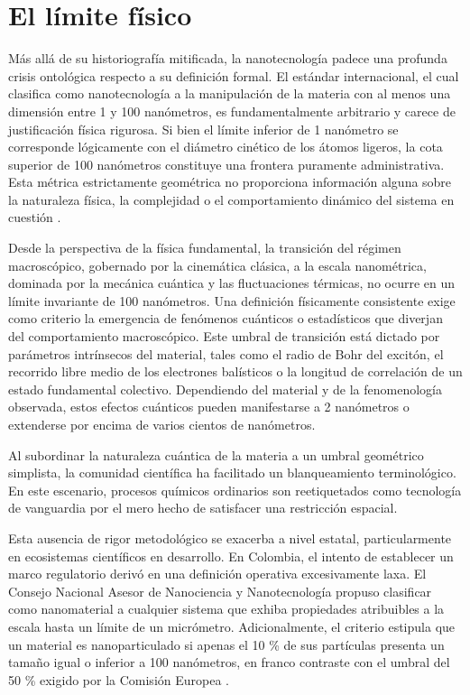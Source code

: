 \section{El límite físico}

Más allá de su historiografía mitificada, la nanotecnología padece una profunda
crisis ontológica respecto a su definición formal. El estándar internacional, el
cual clasifica como nanotecnología a la manipulación de la materia con al menos
una dimensión entre 1 y 100 nanómetros, es fundamentalmente arbitrario y carece
de justificación física rigurosa. Si bien el límite inferior de 1
nanómetro se corresponde lógicamente con el diámetro cinético de los átomos
ligeros, la cota superior de 100 nanómetros constituye una frontera puramente
administrativa. Esta métrica estrictamente geométrica no
proporciona información alguna sobre la naturaleza física, la complejidad o el
comportamiento dinámico del sistema en cuestión
\cite{bensaude-vincentTwoCulturesNanotechnology2006,
jonesSoftMachinesNanotechnology2004}.

Desde la perspectiva de la física fundamental, la transición del régimen
macroscópico, gobernado por la cinemática clásica, a la escala nanométrica,
dominada por la mecánica cuántica y las fluctuaciones térmicas, no ocurre en un
límite invariante de 100 nanómetros. Una definición físicamente
consistente exige como criterio la emergencia de fenómenos cuánticos o
estadísticos que diverjan del comportamiento macroscópico. Este
umbral de transición está dictado por parámetros intrínsecos del material,
tales como el radio de Bohr del excitón, el recorrido libre medio de los
electrones balísticos o la longitud de correlación de un estado fundamental
colectivo. Dependiendo del material y de la fenomenología observada,
estos efectos cuánticos pueden manifestarse a 2 nanómetros o extenderse por
encima de varios cientos de nanómetros.

Al subordinar la naturaleza cuántica de la materia a un umbral geométrico
simplista, la comunidad científica ha facilitado un blanqueamiento
terminológico. En este escenario, procesos químicos ordinarios son
reetiquetados como tecnología de vanguardia por el mero hecho de satisfacer
una restricción espacial.

Esta ausencia de rigor metodológico se exacerba a nivel estatal,
particularmente en ecosistemas científicos en desarrollo. En Colombia, el
intento de establecer un marco regulatorio derivó en una definición
operativa excesivamente laxa. El Consejo Nacional Asesor de Nanociencia y
Nanotecnología propuso clasificar como nanomaterial a cualquier sistema que
exhiba propiedades atribuibles a la escala hasta un límite de un micrómetro.
Adicionalmente, el criterio estipula que un material es
nanoparticulado si apenas el 10 \% de sus partículas presenta un tamaño igual
o inferior a 100 nanómetros, en franco contraste con el umbral del 50 \%
exigido por la Comisión Europea \cite{camachoDefinicionNanomaterialesPara2016}.

